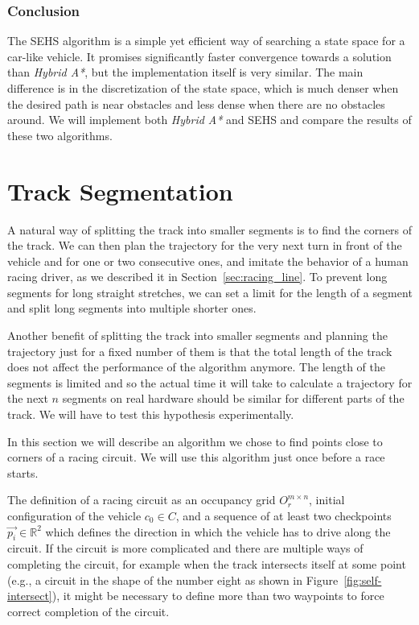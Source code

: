 \subsubsection{Conclusion}

The \gls*{SEHS} algorithm is a simple yet efficient way of searching a state space for a car-like vehicle. It promises significantly faster convergence towards a solution than \textit{Hybrid A*}, but the implementation itself is very similar. The main difference is in the discretization of the state space, which is much denser when the desired path is near obstacles and less dense when there are no obstacles around. We will implement both \textit{Hybrid A*} and \gls*{SEHS} and compare the results of these two algorithms.

\section{Track Segmentation}
\label{sec:track_segmentation}

A natural way of splitting the track into smaller segments is to find the corners of the track. We can then plan the trajectory for the very next turn in front of the vehicle and for one or two  consecutive ones, and imitate the behavior of a human racing driver, as we described it in Section~\ref{sec:racing_line}. To prevent long segments for long straight stretches, we can set a limit for the length of a segment and split long segments into multiple shorter ones.

Another benefit of splitting the track into smaller segments and planning the trajectory just for a fixed number of them is that the total length of the track does not affect the performance of the algorithm anymore. The length of the segments is limited and so the actual time it will take to calculate a trajectory for the next $n$ segments on real hardware should be similar for different parts of the track. We will have to test this hypothesis experimentally.

In this section we will describe an algorithm we chose to find points close to corners of a racing circuit. We will use this algorithm just once before a race starts.

The definition of a racing circuit as an occupancy grid $O_r^{m\times n}$, initial configuration of the vehicle $c_0\in C$, and a sequence of at least two checkpoints $\vec{p_i}\in\mathbb{R}^2$ which defines the direction in which the vehicle has to drive along the circuit. If the circuit is more complicated and there are multiple ways of completing the circuit, for example when the track intersects itself at some point (e.g., a circuit in the shape of the number eight as shown in Figure~\ref{fig:self-intersect}), it might be necessary to define more than two waypoints to force correct completion of the circuit.

